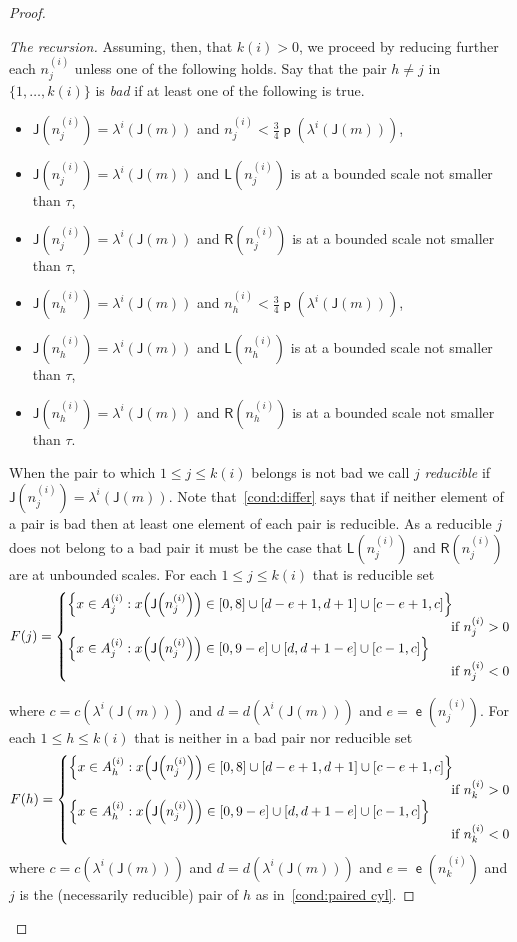 \documentclass[AHL,Unicode,longabstracts,published]{cedram}
\DeclareMathOperator{\lst}{\mathsf{e}}
\DeclareMathOperator{\p}{\mathsf{p}}
\newcommand{\lft}{\mathsf{L}}
\newcommand{\rht}{\mathsf{R}}
\newcommand{\scl}{\mathsf{J}}
\let\originalleft\left
\let\originalright\right
\renewcommand{\left}{\mathopen{}\mathclose\bgroup\originalleft}
\renewcommand{\right}{\aftergroup\egroup\originalright}
\begin{document}
\begin{proof}
\begin{proof}[{The recursion}]
Assuming, then, that $k(i) > 0$, we proceed by reducing further each $n^{(i)}_j$ unless one of the following holds. Say that the pair $h \ne j$ in $\{1,\dots,k(i) \}$ is
\emph{bad} if at least one of the following is true.
\begin{itemize}
\item $\scl(n_j^{(i)}) = \lambda^i(\scl(m))$ and $n_j^{(i)} < \frac{3}{4} \p(\lambda^i(\scl(m)))$,
\item $\scl(n_j^{(i)}) = \lambda^i(\scl(m))$ and $\lft(n_j^{(i)})$ is at a bounded scale not smaller than $\tau$,
\item $\scl(n_j^{(i)}) = \lambda^i(\scl(m))$ and $\rht(n_j^{(i)})$ is at a bounded scale not smaller than $\tau$,
\item $\scl(n_h^{(i)}) = \lambda^i(\scl(m))$ and $n_h^{(i)}<\frac{3}{4} \p(\lambda^i(\scl(m)))$,
\item $\scl(n_h^{(i)}) = \lambda^i(\scl(m))$ and $\lft(n_h^{(i)})$ is at a bounded scale not smaller than $\tau$,
\item $\scl(n_h^{(i)}) = \lambda^i(\scl(m))$ and $\rht(n_h^{(i)})$ is at a bounded scale not smaller than $\tau$.
\end{itemize}
When the pair to which $1 \le j \le k(i)$ belongs is not bad we call $j$
\emph{reducible} if $\scl(n_j^{(i)}) = \lambda^{i}(\scl(m))$. Note that~\eqref{cond:differ} says that if neither element of a pair is bad then at least one element of each pair is reducible. As a reducible $j$ does not belong to a bad pair it must be the case that $\lft(n^{(i)}_j)$ and $\rht(n^{(i)}_j)$ are at unbounded scales. For each $1 \le j \le k(i)$ that is reducible set
\[
F(j) =
\begin{cases}
\left\{ x \in A^{(i)}_j : x\left(\scl\left(n^{(i)}_j\right)\right) \in [0,8] \cup [d-e+1, d+1] \cup [c-e+1, c] \right\}\\
&
\mkern-20mu\text{if } n^{(i)}_j>0
\\
\left\{ x \in A^{(i)}_j : x\left(\scl\left(n^{(i)}_j\right)\right) \in [0,9-e] \cup [d,d+1-e] \cup [c-1,c] \right\}\\
&
\mkern-20mu\text{if } n^{(i)}_j < 0
\end{cases}
\]
\pagebreak{}

\noindent
where $c = c(\lambda^i(\scl(m)))$ and $d = d(\lambda^i(\scl(m)))$ and $e = \lst(n^{(i)}_j)$. For each $1 \le h \le k(i)$ that is neither in a bad pair nor reducible set
\[
F(h) =
\begin{cases}
\left\{ x \in A^{(i)}_h : x\left(\scl\left(n^{(i)}_j\right)\right) \in [0,8] \cup [d-e+1, d+1] \cup [c-e+1, c] \right\} \\
&
\mkern-20mu\text{if } n^{(i)}_k > 0
\\
\left\{ x \in A^{(i)}_h : x\left(\scl\left(n^{(i)}_j\right)\right) \in [0,9-e] \cup [d,d+1-e] \cup [c-1,c] \right\}\\
&
\mkern-20mu\text{if } n^{(i)}_k < 0
\end{cases}
\]
where $c = c(\lambda^i(\scl(m)))$ and $d = d(\lambda^i(\scl(m)))$ and $e = \lst(n^{(i)}_k)$ and $j$ is the (necessarily reducible) pair of $h$ as in~\eqref{cond:paired cyl}.


\end{proof}
\end{proof}
\end{document}
